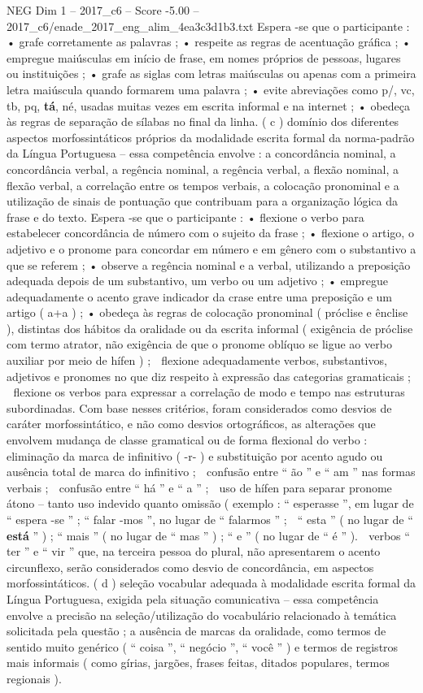 \begin{textsample}{NEG Dim 1 – 2017\_c6 – Score -5.00 – 2017\_c6/enade\_2017\_eng\_alim\_4ea3c3d1b3.txt}
Espera -se que o participante : • grafe corretamente as palavras ; • respeite as regras de acentuação gráfica ; • empregue maiúsculas em início de frase, em nomes próprios de pessoas, lugares ou instituições ; • grafe as siglas com letras maiúsculas ou apenas com a primeira letra maiúscula quando formarem uma palavra ; • evite abreviações como p/, vc, tb, pq, \textbf{tá}, né, usadas muitas vezes em escrita informal e na internet ; • obedeça às regras de separação de sílabas no final da linha. ( c ) domínio dos diferentes aspectos morfossintáticos próprios da modalidade escrita formal da norma-padrão da Língua Portuguesa – essa competência envolve : a concordância nominal, a concordância verbal, a regência nominal, a regência verbal, a flexão nominal, a flexão verbal, a correlação entre os tempos verbais, a colocação pronominal e a utilização de sinais de pontuação que contribuam para a organização lógica da frase e do texto.
Espera -se que o participante : • flexione o verbo para estabelecer concordância de número com o sujeito da frase ; • flexione o artigo, o adjetivo e o pronome para concordar em número e em gênero com o substantivo a que se referem ; • observe a regência nominal e a verbal, utilizando a preposição adequada depois de um substantivo, um verbo ou um adjetivo ; • empregue adequadamente o acento grave indicador da crase entre uma preposição e um artigo ( a+a ) ; • obedeça às regras de colocação pronominal ( próclise e ênclise ), distintas dos hábitos da oralidade ou da escrita informal ( exigência de próclise com termo atrator, não exigência de que o pronome oblíquo se ligue ao verbo auxiliar por meio de hífen ) ;  flexione adequadamente verbos, substantivos, adjetivos e pronomes no que diz respeito à expressão das categorias gramaticais ;  flexione os verbos para expressar a correlação de modo e tempo nas estruturas subordinadas.
Com base nesses critérios, foram considerados como desvios de caráter morfossintático, e não como desvios ortográficos, as alterações que envolvem mudança de classe gramatical ou de forma flexional do verbo :  eliminação da marca de infinitivo ( -r- ) e substituição por acento agudo ou ausência total de marca do infinitivo ;  confusão entre “ ão ” e “ am ” nas formas verbais ;  confusão entre “ há ” e “ a ” ;  uso de hífen para separar pronome átono – tanto uso indevido quanto omissão ( exemplo : “ esperasse ”, em lugar de “ espera -se ” ; “ falar -mos ”, no lugar de “ falarmos ” ;  “ esta ” ( no lugar de “ \textbf{está} ” ) ; “ mais ” ( no lugar de “ mas ” ) ; “ e ” ( no lugar de “ é ” ).  verbos “ ter ” e “ vir ” que, na terceira pessoa do plural, não apresentarem o acento circunflexo, serão considerados como desvio de concordância, em aspectos morfossintáticos. ( d ) seleção vocabular adequada à modalidade escrita formal da Língua Portuguesa, exigida pela situação comunicativa – essa competência envolve a precisão na seleção/utilização do vocabulário relacionado à temática solicitada pela questão ; a ausência de marcas da oralidade, como termos de sentido muito genérico ( “ coisa ”, “ negócio ”, “ você ” ) e termos de registros mais informais ( como gírias, jargões, frases feitas, ditados populares, termos regionais ).

\end{textsample}
